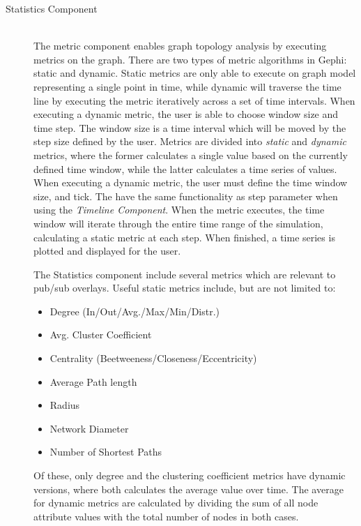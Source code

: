 \begin{description}
\item[Statistics Component] \hfill \\

    The metric component enables graph topology analysis by executing
    metrics on the graph. There are two types of metric algorithms in Gephi:
    static and dynamic. Static metrics are only able to execute on graph
    model representing a single point in time, while dynamic will traverse
    the time line by executing the metric iteratively across a set of time
    intervals. When executing a dynamic metric, the user is able to choose
    window size and time step. The window size is a time interval which will
    be moved by the step size defined by the user. Metrics are divided
    into \emph{static} and \emph{dynamic} metrics, where the former
    calculates a single value based on the currently defined time
    window, while the latter calculates a time series of values. When
    executing a dynamic metric, the user must define the time window
    size, and tick. The have the same functionality as step parameter
    when using the \emph{Timeline Component}. When the metric executes,
    the time window will iterate through the entire time range of the
    simulation, calculating a static metric at each step. When finished,
    a time series is plotted and displayed for the user.

    The Statistics component include several metrics which are relevant
    to pub/sub overlays. Useful static metrics include, but are not
    limited to:

    \begin{itemize}
        \item{Degree (In/Out/Avg./Max/Min/Distr.)}
        \item{Avg. Cluster Coefficient}
        \item{Centrality (Beetweeness/Closeness/Eccentricity)}
        \item{Average Path length}
        \item{Radius}
        \item{Network Diameter}
        \item{Number of Shortest Paths}
    \end{itemize}

    Of these, only degree and the clustering coefficient metrics have dynamic
    versions, where both calculates the average value over time. The
    average for dynamic metrics are calculated by dividing the sum of
    all node attribute values with the total number of nodes in both
    cases.


\end{description}
